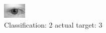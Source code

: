 \begin{figure}[h!]
\begin{center}
\includegraphics[width=0.60\columnwidth]{figures/ID543_class_2_target_3.png}
\end{center}
\caption{ Classification: 2 actual target: 3}
\label{fig:ID543_class_2_target_3}
\end{figure}
